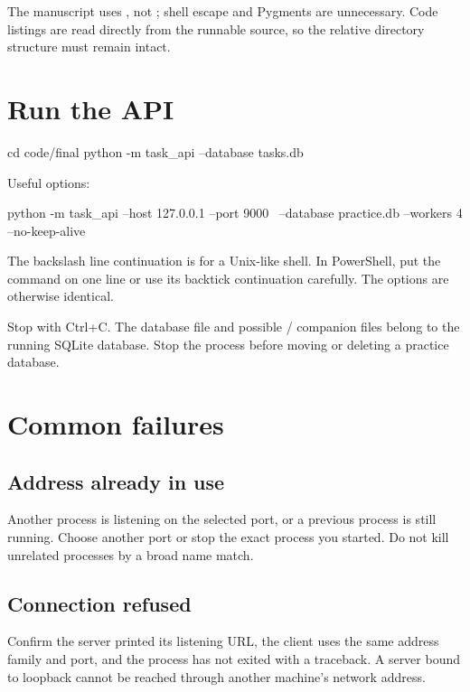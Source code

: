 The manuscript uses , not ; shell escape and Pygments
are unnecessary. Code listings are read directly from the runnable source, so
the relative directory structure must remain intact.

\section{Run the API}

\begin{wiremessage}
cd code/final
python -m task_api --database tasks.db
\end{wiremessage}

Useful options:

\begin{wiremessage}
python -m task_api --host 127.0.0.1 --port 9000 \
  --database practice.db --workers 4 --no-keep-alive
\end{wiremessage}

The backslash line continuation is for a Unix-like shell. In PowerShell, put the
command on one line or use its backtick continuation carefully. The options are
otherwise identical.

Stop with Ctrl+C. The database file and possible / companion
files belong to the running SQLite database. Stop the process before moving or
deleting a practice database.

\section{Common failures}

\subsection{Address already in use}

Another process is listening on the selected port, or a previous process is
still running. Choose another port or stop the exact process you started. Do not
kill unrelated processes by a broad name match.

\subsection{Connection refused}

Confirm the server printed its listening URL, the client uses the same address
family and port, and the process has not exited with a traceback. A server bound
to loopback cannot be reached through another machine's network address.

